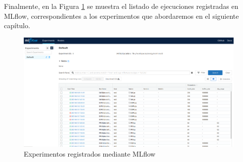 Finalmente, en la Figura \ref{fig:mlflow} se muestra el listado de ejecuciones registradas en MLflow, correspondientes a los experimentos que abordaremos en el siguiente capítulo.

\begin{figure}
    \centering
    \includegraphics[width=\textwidth]{imagenes/mlflow.png}
    \caption{Experimentos registrados mediante MLflow}
    \label{fig:mlflow}
\end{figure}




